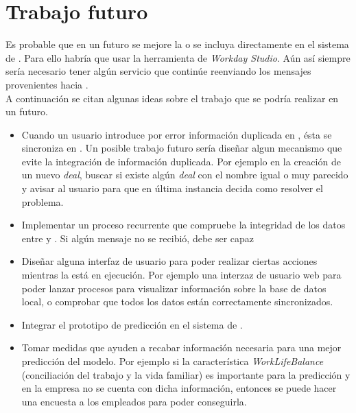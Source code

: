 \chapter{Trabajo futuro}


Es probable que en un futuro se mejore la \iface{} o se incluya directamente en el sistema de \wday{}.
Para ello habría que usar la herramienta de \textit{Workday Studio}.
Aún así siempre sería necesario tener algún servicio que continúe reenviando los mensajes provenientes \hs{} hacia \wday{}. \\

A continuación se citan algunas ideas sobre el trabajo que se podría realizar en un futuro.
\begin{itemize}
	\item Cuando un usuario introduce por error información duplicada en \hs{}, ésta se sincroniza en \wday{}. 
	Un posible trabajo futuro sería diseñar algun mecanismo que evite la integración de información duplicada. 
	Por ejemplo en la creación de un nuevo \textit{deal}, buscar si existe algún \textit{deal} con el nombre igual o muy parecido y avisar al usuario para que en última instancia decida como resolver el problema.
	
	\item Implementar un proceso recurrente que compruebe la integridad de los datos entre \hs{} y \wday{}. Si algún mensaje no se recibió, debe ser capaz 
	
	\item Diseñar alguna interfaz de usuario para poder realizar ciertas acciones mientras la \iface{} está en ejecución. Por ejemplo una interzaz de usuario web para poder lanzar procesos para visualizar información sobre la base de datos local, o comprobar que todos los datos están correctamente sincronizados.
	
	\item Integrar el prototipo de predicción en el sistema de \wday{}.
	
	\item Tomar medidas que ayuden a recabar información necesaria para una mejor predicción del modelo. 
	Por ejemplo si la característica \textit{WorkLifeBalance} (conciliación del trabajo y la vida familiar) es importante para la predicción y en la empresa no se cuenta con dicha información, entonces se puede hacer una encuesta a los empleados para poder conseguirla.

\end{itemize}



